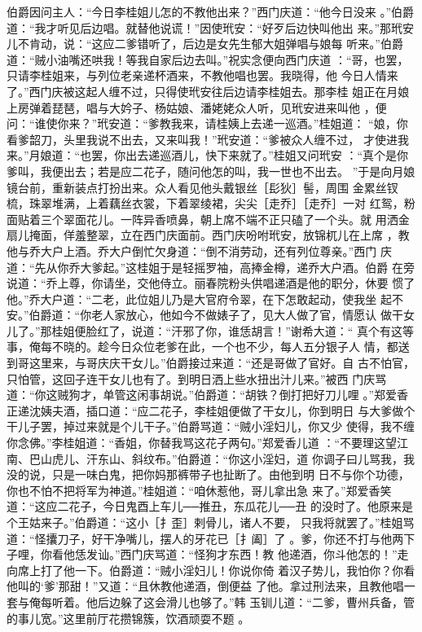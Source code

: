 伯爵因问主人：“今日李桂姐儿怎的不教他出来？”西门庆道：“他今日没来
。”伯爵道：“我才听见后边唱。就替他说谎！”因使玳安：“好歹后边快叫他出
来。”那玳安儿不肯动，说：“这应二爹错听了，后边是女先生郁大姐弹唱与娘每
听来。”伯爵道：“贼小油嘴还哄我！等我自家后边去叫。”祝实念便向西门庆道
：“哥，也罢，只请李桂姐来，与列位老亲递杯酒来，不教他唱也罢。我晓得，他
今日人情来了。”西门庆被这起人缠不过，只得使玳安往后边请李桂姐去。那李桂
姐正在月娘上房弹着琵琶，唱与大妗子、杨姑娘、潘姥姥众人听，见玳安进来叫他
，便问：“谁使你来？”玳安道：“爹教我来，请桂姨上去递一巡酒。”桂姐道：
“娘，你看爹韶刀，头里我说不出去，又来叫我！”玳安道：“爹被众人缠不过，
才使进我来。”月娘道：“也罢，你出去递巡酒儿，快下来就了。”桂姐又问玳安
：“真个是你爹叫，我便出去；若是应二花子，随问他怎的叫，我一世也不出去。
”于是向月娘镜台前，重新装点打扮出来。众人看见他头戴银丝［髟狄］髻，周围
金累丝钗梳，珠翠堆满，上着藕丝衣裳，下着翠绫裙，尖尖［走乔］［走乔］一对
红鸳，粉面贴着三个翠面花儿。一阵异香喷鼻，朝上席不端不正只磕了一个头。就
用洒金扇儿掩面，佯羞整翠，立在西门庆面前。西门庆吩咐玳安，放锦杌儿在上席
，教他与乔大户上酒。乔大户倒忙欠身道：“倒不消劳动，还有列位尊亲。”西门
庆道：“先从你乔大爹起。”这桂姐于是轻摇罗袖，高捧金樽，递乔大户酒。伯爵
在旁说道：“乔上尊，你请坐，交他侍立。丽春院粉头供唱递酒是他的职分，休要
惯了他。”乔大户道：“二老，此位姐儿乃是大官府令翠，在下怎敢起动，使我坐
起不安。”伯爵道：“你老人家放心，他如今不做婊子了，见大人做了官，情愿认
做干女儿了。”那桂姐便脸红了，说道：“汗邪了你，谁恁胡言！”谢希大道：“
真个有这等事，俺每不晓的。趁今日众位老爹在此，一个也不少，每人五分银子人
情，都送到哥这里来，与哥庆庆干女儿。”伯爵接过来道：“还是哥做了官好。自
古不怕官，只怕管，这回子连干女儿也有了。到明日洒上些水扭出汁儿来。”被西
门庆骂道：“你这贼狗才，单管这闲事胡说。”伯爵道：“胡铁？倒打把好刀儿哩
。”郑爱香正递沈姨夫酒，插口道：“应二花子，李桂姐便做了干女儿，你到明日
与大爹做个干儿子罢，掉过来就是个儿干子。”伯爵骂道：“贼小淫妇儿，你又少
使得，我不缠你念佛。”李桂姐道：“香姐，你替我骂这花子两句。”郑爱香儿道
：“不要理这望江南、巴山虎儿、汗东山、斜纹布。”伯爵道：“你这小淫妇，道
你调子曰儿骂我，我没的说，只是一味白鬼，把你妈那裤带子也扯断了。由他到明
日不与你个功德，你也不怕不把将军为神道。”桂姐道：“咱休惹他，哥儿拿出急
来了。”郑爱香笑道：“这应二花子，今日鬼酉上车儿──推丑，东瓜花儿──丑
的没时了。他原来是个王姑来子。”伯爵道：“这小［扌歪］剌骨儿，诸人不要，
只我将就罢了。”桂姐骂道：“怪攮刀子，好干净嘴儿，摆人的牙花已［扌阖］了
。爹，你还不打与他两下子哩，你看他恁发讪。”西门庆骂道：“怪狗才东西！教
他递酒，你斗他怎的！”走向席上打了他一下。伯爵道：“贼小淫妇儿！你说你倚
着汉子势儿，我怕你？你看他叫的‘爹’那甜！”又道：“且休教他递酒，倒便益
了他。拿过刑法来，且教他唱一套与俺每听着。他后边躲了这会滑儿也够了。”韩
玉钏儿道：“二爹，曹州兵备，管的事儿宽。”这里前厅花攒锦簇，饮酒顽耍不题
。

